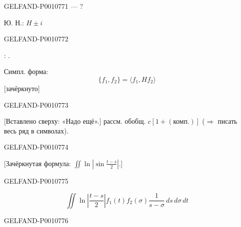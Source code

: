 \begin{GelfandAdjacentEvidence}{GELFAND-P001077}{1}
 — ?

Ю. Н.\quad{}: $H\pm i$
\end{GelfandAdjacentEvidence}
\begin{GelfandAdjacentEvidence}{GELFAND-P001077}{2}


: .

Симпл. форма:
\begin{equation*}
\{f_1,f_2\}=\langle f_1,Hf_2\rangle
\end{equation*}
 [зачёркнуто]
\end{GelfandAdjacentEvidence}
\begin{GelfandAdjacentEvidence}{GELFAND-P001077}{3}

[Вставлено сверху: «Надо ещё».] рассм. обобщ. $c[1+(\text{комп.})]$
($\Rightarrow$ писать весь ряд в символах).
\end{GelfandAdjacentEvidence}
\begin{GelfandAdjacentEvidence}{GELFAND-P001077}{4}


[Зачёркнутая формула: \(\iint\ln\left|\sin\frac{t-s}{2}\right|\).]
\end{GelfandAdjacentEvidence}
\begin{GelfandAdjacentEvidence}{GELFAND-P001077}{5}


\begin{equation*}
\iint\ln\left|\frac{t-s}{2}\right|f_1(t)f_2(\sigma)
\frac{1}{s-\sigma}\,ds\,d\sigma\,dt
\end{equation*}
\end{GelfandAdjacentEvidence}
\begin{GelfandAdjacentEvidence}{GELFAND-P001077}{6}

\end{GelfandAdjacentEvidence}
